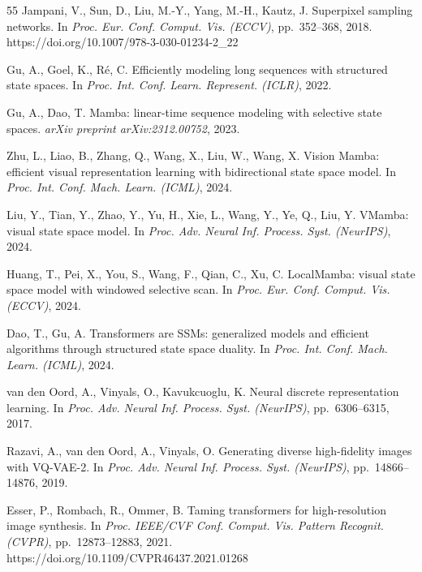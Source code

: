 \documentclass[lettersize,journal]{IEEEtran}
\begin{document}
\begin{thebibliography}{55}
Jampani, V., Sun, D., Liu, M.-Y., Yang, M.-H., Kautz, J. Superpixel sampling networks. In \textit{Proc. Eur. Conf. Comput. Vis. (ECCV)}, pp.~352--368, 2018. https://doi.org/10.1007/978-3-030-01234-2\_22


Gu, A., Goel, K., R\'{e}, C. Efficiently modeling long sequences with structured state spaces. In \textit{Proc. Int. Conf. Learn. Represent. (ICLR)}, 2022.

Gu, A., Dao, T. Mamba: linear-time sequence modeling with selective state spaces. \textit{arXiv preprint arXiv:2312.00752}, 2023.

Zhu, L., Liao, B., Zhang, Q., Wang, X., Liu, W., Wang, X. Vision Mamba: efficient visual representation learning with bidirectional state space model. In \textit{Proc. Int. Conf. Mach. Learn. (ICML)}, 2024.

Liu, Y., Tian, Y., Zhao, Y., Yu, H., Xie, L., Wang, Y., Ye, Q., Liu, Y. VMamba: visual state space model. In \textit{Proc. Adv. Neural Inf. Process. Syst. (NeurIPS)}, 2024.

Huang, T., Pei, X., You, S., Wang, F., Qian, C., Xu, C. LocalMamba: visual state space model with windowed selective scan. In \textit{Proc. Eur. Conf. Comput. Vis. (ECCV)}, 2024.

Dao, T., Gu, A. Transformers are SSMs: generalized models and efficient algorithms through structured state space duality. In \textit{Proc. Int. Conf. Mach. Learn. (ICML)}, 2024.


van den Oord, A., Vinyals, O., Kavukcuoglu, K. Neural discrete representation learning. In \textit{Proc. Adv. Neural Inf. Process. Syst. (NeurIPS)}, pp.~6306--6315, 2017.

Razavi, A., van den Oord, A., Vinyals, O. Generating diverse high-fidelity images with VQ-VAE-2. In \textit{Proc. Adv. Neural Inf. Process. Syst. (NeurIPS)}, pp.~14866--14876, 2019.

Esser, P., Rombach, R., Ommer, B. Taming transformers for high-resolution image synthesis. In \textit{Proc. IEEE/CVF Conf. Comput. Vis. Pattern Recognit. (CVPR)}, pp.~12873--12883, 2021. https://doi.org/10.1109/CVPR46437.2021.01268


\end{thebibliography}
\end{document}
